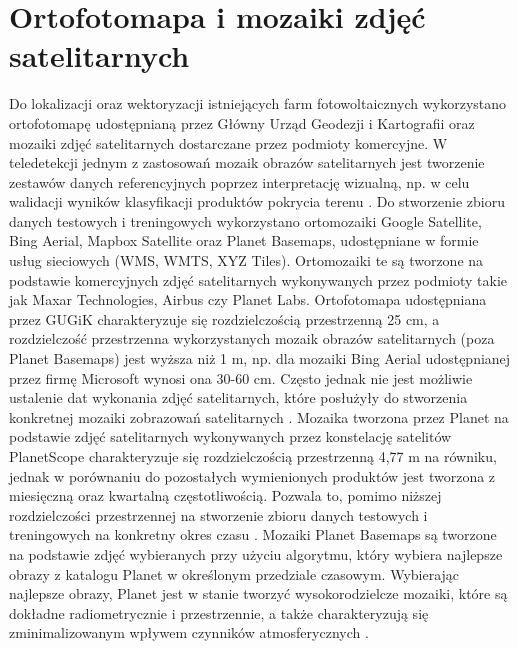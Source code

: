 \documentclass{amuthesis}
\begin{document}
\hypertarget{sec-mosaics}{%
\section{Ortofotomapa i mozaiki zdjęć satelitarnych}\label{sec-mosaics}}

Do lokalizacji oraz wektoryzacji istniejących farm fotowoltaicznych
wykorzystano ortofotomapę udostępnianą przez Główny Urząd Geodezji i
Kartografii oraz mozaiki zdjęć satelitarnych dostarczane przez podmioty
komercyjne. W teledetekcji jednym z zastosowań mozaik obrazów
satelitarnych jest tworzenie zestawów danych referencyjnych poprzez
interpretację wizualną, np. w celu walidacji wyników klasyfikacji
produktów pokrycia terenu \autocite{lesiv_2018_sat_imagery_mosaics}. Do
stworzenie zbioru danych testowych i treningowych wykorzystano
ortomozaiki Google Satellite, Bing Aerial, Mapbox Satellite oraz Planet
Basemaps, udostępniane w formie usług sieciowych (WMS, WMTS, XYZ Tiles).
Ortomozaiki te są tworzone na podstawie komercyjnych zdjęć satelitarnych
wykonywanych przez podmioty takie jak Maxar Technologies, Airbus czy
Planet Labs. Ortofotomapa udostępniana przez GUGiK charakteryzuje się
rozdzielczością przestrzenną 25 cm, a rozdzielczość przestrzenna
wykorzystanych mozaik obrazów satelitarnych (poza Planet Basemaps) jest
wyższa niż 1 m, np. dla mozaiki Bing Aerial udostępnianej przez firmę
Microsoft wynosi ona 30-60 cm. Często jednak nie jest możliwie ustalenie
dat wykonania zdjęć satelitarnych, które posłużyły do stworzenia
konkretnej mozaiki zobrazowań satelitarnych
\autocite{lesiv_2018_sat_imagery_mosaics}. Mozaika tworzona przez Planet
na podstawie zdjęć satelitarnych wykonywanych przez konstelację
satelitów PlanetScope charakteryzuje się rozdzielczością przestrzenną
4,77 m na równiku, jednak w porównaniu do pozostałych wymienionych
produktów jest tworzona z miesięczną oraz kwartalną częstotliwością.
Pozwala to, pomimo niższej rozdzielczości przestrzennej na stworzenie
zbioru danych testowych i treningowych na konkretny okres czasu
\autocite{planet-basemaps-product-specifications.pdf}. Mozaiki Planet
Basemaps są tworzone na podstawie zdjęć wybieranych przy użyciu
algorytmu, który wybiera najlepsze obrazy z katalogu Planet w określonym
przedziale czasowym. Wybierając najlepsze obrazy, Planet jest w stanie
tworzyć wysokorodzielcze mozaiki, które są dokładne radiometrycznie i
przestrzennie, a także charakteryzują się zminimalizowanym wpływem
czynników atmosferycznych
\autocite[??]{planet-basemaps-product-specifications.pdf}.
\end{document}
